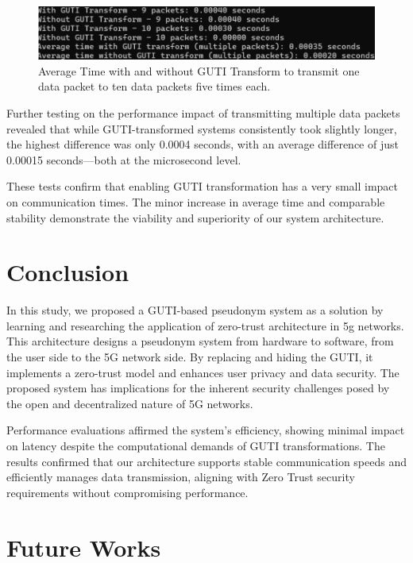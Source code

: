 \documentclass[sigplan,screen]{acmart}
\begin{document}
\begin{figure}[htbp]
\centering
\includegraphics[width=\linewidth]{averageTime2.png}
\caption{Average Time with and without GUTI Transform to transmit one data packet to ten data packets five times each.}
\end{figure}

Further testing on the performance impact of transmitting multiple data packets revealed that while GUTI-transformed systems consistently took slightly longer, the highest difference was only 0.0004 seconds, with an average difference of just 0.00015 seconds—both at the microsecond level.

These tests confirm that enabling GUTI transformation has a very small impact on communication times. The minor increase in average time and comparable stability demonstrate the viability and superiority of our system architecture.


\section{Conclusion}
In this study, we proposed a GUTI-based pseudonym system as a solution by learning and researching the application of zero-trust architecture in 5g networks. This architecture designs a pseudonym system from hardware to software, from the user side to the 5G network side. By replacing and hiding the GUTI, it implements a zero-trust model and enhances user privacy and data security. The proposed system has implications for the inherent security challenges posed by the open and decentralized nature of 5G networks.

Performance evaluations affirmed the system's efficiency, showing minimal impact on latency despite the computational demands of GUTI transformations. The results confirmed that our architecture supports stable communication speeds and efficiently manages data transmission, aligning with Zero Trust security requirements without compromising performance.

\section{Future Works}
\end{document}
